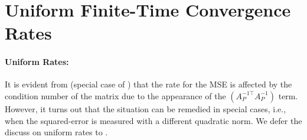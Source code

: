 \section{Uniform Finite-Time Convergence Rates}
\paragraph{Uniform Rates:} It is evident from  (special case of ) that the rate for the MSE is affected by the condition number of the matrix due to the appearance of the $(A_P^{-1\top} A_P^{-1})$ term.  However, it turns out that the situation can be remedied in special cases, i.e., when the squared-error is measured with a different quadratic norm. We defer the discuss on uniform rates to .
\begin{table}
\begin{tabular}\hline
{}
\end{tabular}
\end{table}